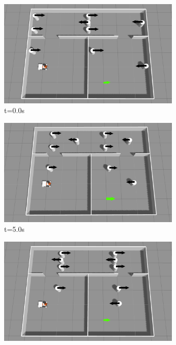\begin{figure}[H]
    \centering
    \begin{subfigure}[b]{0.50\linewidth}
        \centering
        \includegraphics[width=0.95\textwidth]{images/test_case_3/exp1.png}
        \caption{t=0.0s}
    \end{subfigure}%
    \begin{subfigure}[b]{0.50\linewidth}
        \centering
        \includegraphics[width=0.95\textwidth]{images/test_case_3/mid1.png}
        \caption{t=5.0s}
    \end{subfigure}
    \begin{subfigure}[b]{0.50\linewidth}
        \centering
        \includegraphics[width=0.95\textwidth]{images/test_case_3/exp2.png}

\end{subfigure}
\end{figure}
